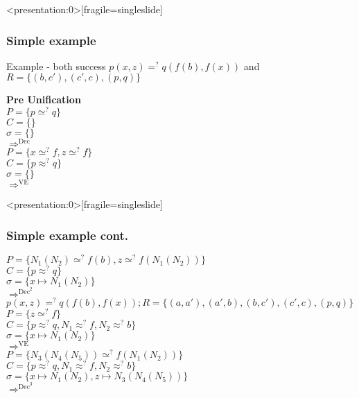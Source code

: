 		
		\begin{frame}<presentation:0>[fragile=singleslide]
	\frametitle{Simple example}
	\begin{exampleblock}{Example - both success}
	\(p(x,z) =^? q(f(b),f(x))\) and \(R=\{(b,c'),(c',c),(p,q)\}\)\\
	\end{exampleblock}
	\textbf{Pre Unification} \\
	
	\(P=\{p \simeq^? q\}\)\\
	\(C=\{\}\)\\
	\(\sigma=\{\}\)\\
	\(\Rightarrow^{\text{Dec}}\)\\
	\(P=\{x \simeq^? f, z \simeq^? f\}\)\\
	\(C=\{p \approx^? q\}\)\\
	\(\sigma=\{\}\)\\
	\(\Rightarrow^{\text{VE}}\)\\
	
	\end{frame}
	\begin{frame}<presentation:0>[fragile=singleslide]
	\frametitle{Simple example cont.}
	\(P=\{N_1(N_2) \simeq^? f(b), z \simeq^? f(N_1(N_2))\}\)\\
	\(C=\{p \approx^? q\}\)\\
	\(\sigma=\{x \mapsto N_1(N_2)\}\)\\
	\(\Rightarrow^{\text{Dec}^2}\)\\
	\(p(x,z) =^? q(f(b),f(x)) ; R=\{(a,a'),(a',b),(b,c'),(c',c),(p,q)\}\)\\
	\(P=\{z \simeq^? f\}\)\\
	\(C=\{p \approx^? q, N_1 \approx^? f, N_2 \approx^? b\}\)\\
	\(\sigma=\{x \mapsto N_1(N_2)\}\)\\
	\(\Rightarrow^{\text{VE}}\)\\
	\(P=\{N_3(N_4(N_5)) \simeq^? f(N_1(N_2))\}\)\\
	\(C=\{p \approx^? q, N_1 \approx^? f, N_2 \approx^? b\}\)\\
	\(\sigma=\{x \mapsto N_1(N_2),z \mapsto N_3(N_4(N_5))\}\)\\
	\(\Rightarrow^{\text{Dec}^3}\)\\
	\end{frame}
	
